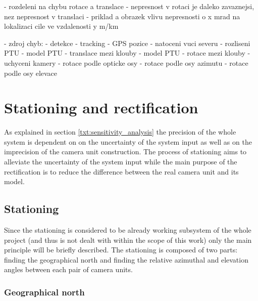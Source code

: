 - rozdeleni na chybu rotace a translace
	- nepresnost v rotaci je daleko zavaznejsi, nez nepresnost v translaci
	- priklad a obrazek vlivu nepresnosti o x mrad na lokalizaci cile ve vzdalenosti y m/km

- zdroj chyb:
	- detekce
	- tracking
	- GPS pozice
	- natoceni vuci severu
	- rozliseni PTU
	- model PTU - translace mezi klouby
	- model PTU - rotace mezi klouby
	- uchyceni kamery
		- rotace podle opticke osy
		- rotace podle osy azimutu
		- rotace podle osy elevace
		

\chapter{Stationing and rectification}

As explained in section \ref{txt:sensitivity_analysis} the precision of the whole system is dependent on on the uncertainty of the system input as well as on the imprecision of the camera unit construction. The process of stationing aims to alleviate the uncertainty of the system input while the main purpose of the rectification is to reduce the difference between the real camera unit and its model.

\section{Stationing}

Since the stationing is considered to be already working subsystem of the whole project (and thus is not dealt with within the scope of this work) only the main principle will be briefly described. The stationing is composed of two parts: finding the geographical north and finding the relative azimuthal and elevation angles between each pair of camera units.

\subsection{Geographical north} \label{txt:geographical_north}

